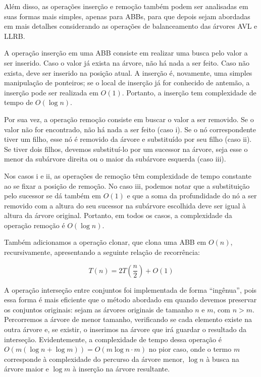 \documentclass[a4paper,12pt]{report}
\begin{document}
Além disso, as operações inserção e remoção também podem ser analisadas em suas
formas mais simples, apenas para ABBs, para que depois sejam abordadas em mais
detalhes considerando as operações de balanceamento das árvores AVL e LLRB.

A operação inserção em uma ABB consiste em realizar uma busca pelo valor a ser
inserido. Caso o valor já exista na árvore, não há nada a ser feito. Caso não 
exista, deve ser inserido na posição atual. A inserção é, novamente, uma simples
manipulação de ponteiros; se o local de inserção já for conhecido de antemão,
a inserção pode ser realizada em $O(1)$. Portanto, a inserção tem complexidade
de tempo de $O(\log n)$.

Por sua vez, a operação remoção consiste em buscar o valor a ser removido. Se o
valor não for encontrado, não há nada a ser feito (caso \Rn{1}). Se o nó 
correspondente tiver um filho, esse nó é removido da árvore e substituído por 
seu filho (caso \Rn{2}). Se tiver dois filhos, devemos substituí-lo por um 
sucessor na árvore, seja esse o menor da subárvore direita ou o maior da subárvore 
esquerda (caso \Rn{3}).

Nos casos \Rn{1} e \Rn{2}, as operações de remoção têm complexidade de tempo constante 
ao se fixar a posição de remoção. No caso \Rn{3}, podemos notar que a substituição
pelo sucessor se dá também em $O(1)$ e que a soma da profundidade do nó a ser removido
com a altura do seu sucessor na subárvore escolhida deve ser igual à altura da árvore
original. Portanto, em todos os casos, a complexidade da operação remoção é $O(\log n)$.

Também adicionamos a operação clonar, que clona uma ABB em $O(n)$, recursivamente, 
apresentando a seguinte relação de recorrência:

\[
                      T(n) = 2T\left(\frac{n}{2}\right) + O(1)
\]

A operação interseção entre conjuntos foi implementada de forma ``ingênua'', pois 
essa forma é mais eficiente que o método abordado em \cite{bfs16} quando 
devemos preservar os conjuntos originais: sejam as árvores originais de tamanho $n$ 
e $m$, com $n > m$. Percorremos a árvore de menor tamanho, verificando se cada 
elemento existe na outra árvore e, se existir, o inserimos na árvore que irá guardar 
o resultado da interseção. Evidentemente, a complexidade de tempo dessa operação é 
$O(m (\log{n} + \log{m})) = O(m \log{n \cdot m})$ no pior caso, onde o termo $m$ 
corresponde à complexidade do percurso da árvore menor, $\log n$ à busca na árvore 
maior e $\log m$ à inserção na árvore resultante.
\end{document}
